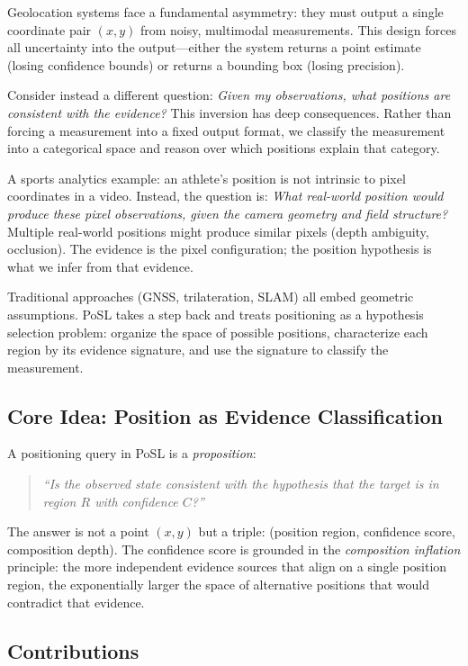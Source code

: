 \documentclass[twocolumn,10pt]{article}
\begin{document}
Geolocation systems face a fundamental asymmetry: they must output a single
coordinate pair $(x,y)$ from noisy, multimodal measurements. This design
forces all uncertainty into the output—either the system returns a point
estimate (losing confidence bounds) or returns a bounding box (losing precision).

Consider instead a different question: \emph{Given my observations, what
positions are consistent with the evidence?} This inversion has deep
consequences. Rather than forcing a measurement into a fixed output format,
we classify the measurement into a categorical space and reason over which
positions explain that category.

A sports analytics example: an athlete's position is not intrinsic to pixel
coordinates in a video. Instead, the question is: \emph{What real-world
position would produce these pixel observations, given the camera geometry
and field structure?} Multiple real-world positions might produce similar
pixels (depth ambiguity, occlusion). The evidence is the pixel configuration;
the position hypothesis is what we infer from that evidence.

Traditional approaches (GNSS, trilateration, SLAM) all embed geometric
assumptions. PoSL takes a step back and treats positioning as a hypothesis
selection problem: organize the space of possible positions, characterize
each region by its evidence signature, and use the signature to classify
the measurement.

\subsection{Core Idea: Position as Evidence Classification}

A positioning query in PoSL is a \emph{proposition}:

\begin{quotation}
\textit{``Is the observed state consistent with the hypothesis that
the target is in region $R$ with confidence $C$?''}
\end{quotation}

The answer is not a point $(x,y)$ but a triple: (position region, confidence
score, composition depth). The confidence score is grounded in the
\emph{composition inflation} principle: the more independent evidence sources
that align on a single position region, the exponentially larger the space
of alternative positions that would contradict that evidence.

\subsection{Contributions}
\end{document}
